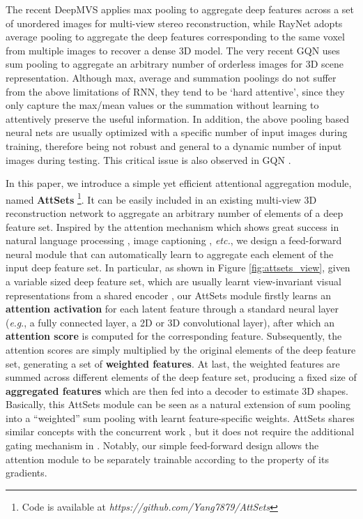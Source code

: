 \documentclass[twocolumn]{svjour3}    \pdfoutput=1
\newcommand{\nickname}{AttSets}
\newcommand{\eg}{\textit{e}.\textit{g}., }
\newcommand{\rev}{}
\begin{document}
The recent DeepMVS \citep{Huang2018} applies max pooling to aggregate deep features across a set of unordered images for multi-view stereo reconstruction, while RayNet \citep{Paschalidou2018} adopts average pooling to aggregate the deep features corresponding to the same voxel from multiple images to recover a dense 3D model. The very recent GQN \citep{Eslami2018} uses sum pooling to aggregate an arbitrary number of orderless images for 3D scene representation. Although max, average and summation poolings do not suffer from the above limitations of RNN, they tend to be `hard attentive', since they only capture the max/mean values or the summation without learning to attentively preserve the useful information. In addition, the above pooling based neural nets are usually optimized with a specific number of input images during training, therefore being not robust and general to a dynamic number of input images during testing. This critical issue is also observed in GQN \citep{Eslami2018}.

In this paper, we introduce a simple yet efficient attentional aggregation module, named \textbf{\nickname{}} \footnote{\small{Code is available at \textit{https://github.com/Yang7879/AttSets}}}. It can be easily included in an existing multi-view 3D reconstruction network to aggregate an arbitrary number of elements of a deep feature set. Inspired by the attention mechanism which shows great success in natural language processing \citep{Bahdanau2015,Raffel2016}, image captioning \citep{Xu2015b}, \textit{etc.}, we design a feed-forward neural module that can automatically learn to aggregate each element of the input deep feature set. In particular, as shown in Figure \ref{fig:attsets_view}, given a variable sized deep feature set, which are usually learnt view-invariant visual representations from a shared encoder \citep{Paschalidou2018}, our \nickname{} module firstly learns an \textbf{attention activation} for each latent feature through a standard neural layer (\eg  a fully connected layer, a 2D or 3D convolutional layer), after which an \textbf{attention score} is computed for the corresponding feature. Subsequently, the attention scores are simply multiplied by the original elements of the deep feature set, generating a set of \textbf{weighted features}. At last, the weighted features are summed across different elements of the deep feature set, producing a fixed size of \textbf{aggregated features} which are then fed into a decoder to estimate 3D shapes. Basically, this \nickname{} module can be seen as a natural extension of sum pooling into a ``weighted'' sum pooling with learnt feature-specific weights. \rev{\nickname{} shares similar concepts with the concurrent work} \citep{Ilse2018}, \rev{but it does not require the additional gating mechanism in} \citep{Ilse2018}. \rev{Notably, our simple feed-forward design allows the attention module to be separately trainable according to the property of its gradients.}
\end{document}
